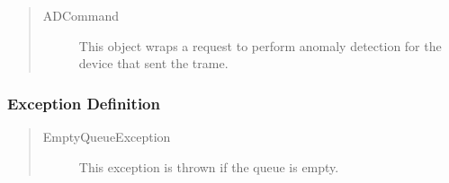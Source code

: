 \begin{quote}
	\begin{description}
		\item[ADCommand] This object wraps a request to perform anomaly detection for
		the device that sent the trame.	
	\end{description} 
\end{quote}

\subsubsection{Exception Definition}

\begin{quote}
	\begin{description}
		\item[EmptyQueueException] This exception is thrown if the queue is empty.
	\end{description} 
\end{quote}

